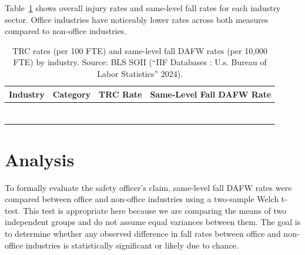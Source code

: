 \documentclass[
  letterpaper,
  DIV=11,
  numbers=noendperiod]{scrreprt}
\begin{document}
Table~\ref{tbl-summary} shows overall injury rates and same-level fall
rates for each industry sector. Office industries have noticeably lower
rates across both measures compared to non-office industries.

\begin{longtable}[t]{lccc}

\caption{\label{tbl-summary}TRC rates (per 100 FTE) and same-level fall
DAFW rates (per 10,000 FTE) by industry. Source: BLS SOII ({``{IIF}
Databases : U.s. Bureau of Labor Statistics''} 2024).}

\tabularnewline

\toprule
Industry & Category & TRC Rate & Same-Level Fall DAFW Rate\\
\midrule
\cellcolor{lightblue}{Finance and Insurance} & \cellcolor{lightblue}{Office} & \cellcolor{lightblue}{0.3} & \cellcolor{lightblue}{5.4}\\
\cellcolor{lightblue}{Information} & \cellcolor{lightblue}{Office} & \cellcolor{lightblue}{0.7} & \cellcolor{lightblue}{7.9}\\
\cellcolor{lightblue}{Professional \& Business Services} & \cellcolor{lightblue}{Office} & \cellcolor{lightblue}{1.0} & \cellcolor{lightblue}{6.2}\\
\cellcolor{salmon}{Construction} & \cellcolor{salmon}{Non-Office} & \cellcolor{salmon}{2.2} & \cellcolor{salmon}{11.0}\\
\cellcolor{salmon}{Manufacturing} & \cellcolor{salmon}{Non-Office} & \cellcolor{salmon}{2.7} & \cellcolor{salmon}{12.1}\\
\addlinespace
\cellcolor{salmon}{Natural Resources \& Mining} & \cellcolor{salmon}{Non-Office} & \cellcolor{salmon}{2.8} & \cellcolor{salmon}{19.6}\\
\cellcolor{salmon}{Trade, Transportation \& Utilities} & \cellcolor{salmon}{Non-Office} & \cellcolor{salmon}{3.1} & \cellcolor{salmon}{20.2}\\
\bottomrule

\end{longtable}

\section{Analysis}\label{analysis}

To formally evaluate the safety officer's claim, same-level fall DAFW
rates were compared between office and non-office industries using a
two-sample Welch t-test. This test is appropriate here because we are
comparing the means of two independent groups and do not assume equal
variances between them. The goal is to determine whether any observed
difference in fall rates between office and non-office industries is
statistically significant or likely due to chance.
\end{document}
